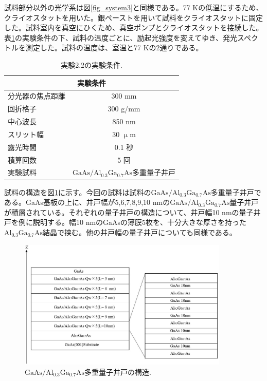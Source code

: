 \documentclass[11pt,a4j]{jsarticle}
\begin{document}
試料部分以外の光学系は図\ref{fig_system3}と同様である。77 Kの低温にするため、クライオスタットを用いた。銀ペーストを用いて試料をクライオスタットに固定した。試料室内を真空にひくため、真空ポンプとクライオスタットを接続した。表\ref{col_2.3}の実験条件の下、試料の温度ごとに、励起光強度を変えてゆき、発光スペクトルを測定した。試料の温度は、室温と77 Kの2通りである。

\begin{table}[ht]
 \centering
 \caption{実験2.2の実験条件.}
 \begin{tabular}{lc}\hline
  \multicolumn{2}{c}{実験条件}                                      \\ \hline
  分光器の焦点距離 & 300 mm                                         \\
  回折格子         & 300 g/mm                                       \\
  中心波長         & 850 nm                                         \\
  スリット幅       & 30 $\upmu$m                                    \\
  露光時間         & 0.1 秒                                         \\
  積算回数         & 5 回                                           \\
  実験試料         & $\mathrm{GaAs/Al_{0.3}Ga_{0.7}As}$多重量子井戸 \\ \hline
 \end{tabular}
 \label{col_2.3}
\end{table}

\newpage
試料の構造を図\ref{fig_algaas1}に示す。今回の試料は試料の$\mathrm{GaAs/Al_{0.3}Ga_{0.7}As}$多重量子井戸である。GaAs基板の上に、井戸幅が5,6,7,8,9,10 nmの$\mathrm{GaAs/Al_{0.3}Ga_{0.7}As}$量子井戸が積層されている。それぞれの量子井戸の構造について、井戸幅10 nmの量子井戸を例に説明する。幅10 nmのGaAsの薄膜5枚を、十分大きな厚さを持った$\mathrm{Al_{0.3}Ga_{0.7}As}$結晶で挟む。他の井戸幅の量子井戸についても同様である。

\begin{figure}[h]
 \centering
 \includegraphics[clip,width=10cm]{start_AlGaAs.jpg}
 \caption{$\mathrm{GaAs/Al_{0.3}Ga_{0.7}As}$多重量子井戸の構造.}
 \label{fig_algaas1}
\end{figure}
\end{document}
